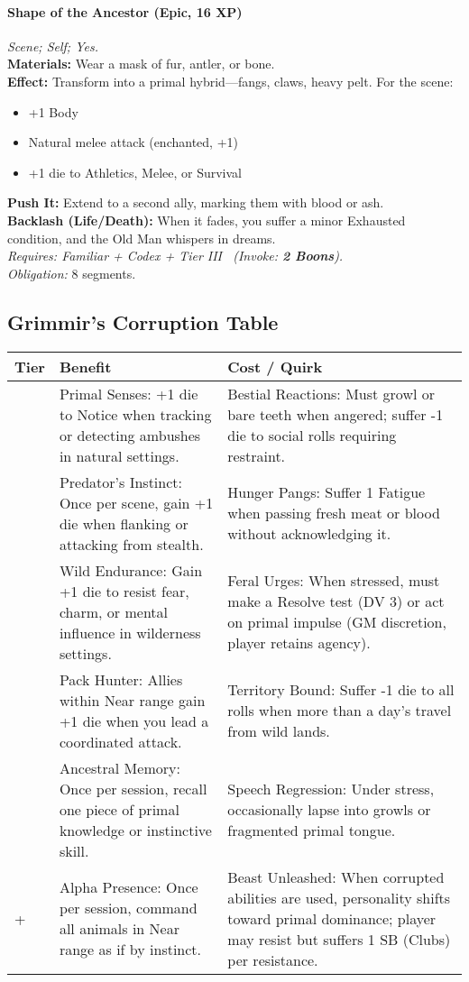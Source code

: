 \paragraph{Shape of the Ancestor (Epic, 16 XP)} \emph{Scene; Self; Yes.}\\
\textbf{Materials:} Wear a mask of fur, antler, or bone.\\
\textbf{Effect:} Transform into a primal hybrid—fangs, claws, heavy pelt. For the scene:
\begin{itemize}
  \item +1 Body
  \item Natural melee attack (enchanted, +1)
  \item +1 die to Athletics, Melee, or Survival
\end{itemize}
\textbf{Push It:} Extend to a second ally, marking them with blood or ash.\\
\textbf{Backlash (Life/Death):} When it fades, you suffer a minor Exhausted condition, and the Old Man whispers in dreams.\\
\emph{Requires: Familiar + Codex + Tier III \ (\textit{Invoke:} \textbf{2 Boons}).}\\
\emph{Obligation:} 8 segments.

\subsection*{Grimmir's Corruption Table}
\label{sec:grimmir-corruption}

\begin{longtable}{>{\raggedright\arraybackslash}p{1cm} p{5cm} p{5cm}}
\toprule
\textbf{Tier} & \textbf{Benefit} & \textbf{Cost / Quirk} \\
\midrule
1 & Primal Senses: +1 die to Notice when tracking or detecting ambushes in natural settings. & Bestial Reactions: Must growl or bare teeth when angered; suffer -1 die to social rolls requiring restraint. \\
\midrule
2 & Predator's Instinct: Once per scene, gain +1 die when flanking or attacking from stealth. & Hunger Pangs: Suffer 1 Fatigue when passing fresh meat or blood without acknowledging it. \\
\midrule
3 & Wild Endurance: Gain +1 die to resist fear, charm, or mental influence in wilderness settings. & Feral Urges: When stressed, must make a Resolve test (DV 3) or act on primal impulse (GM discretion, player retains agency). \\
\midrule
4 & Pack Hunter: Allies within Near range gain +1 die when you lead a coordinated attack. & Territory Bound: Suffer -1 die to all rolls when more than a day's travel from wild lands. \\
\midrule
5 & Ancestral Memory: Once per session, recall one piece of primal knowledge or instinctive skill. & Speech Regression: Under stress, occasionally lapse into growls or fragmented primal tongue. \\
\midrule
6+ & Alpha Presence: Once per session, command all animals in Near range as if by instinct. & Beast Unleashed: When corrupted abilities are used, personality shifts toward primal dominance; player may resist but suffers 1 SB (Clubs) per resistance. \\
\bottomrule
\end{longtable}